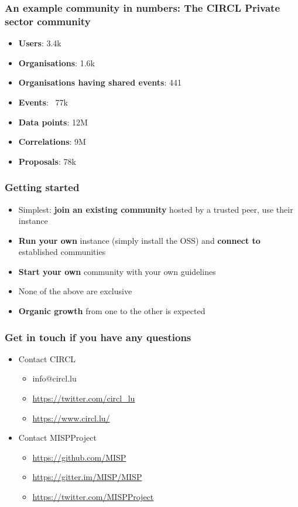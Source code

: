 \begin{frame}
\frametitle{An example community in numbers: The CIRCL Private sector community}
\begin{itemize}
       \item {\bf Users}: 3.4k
       \item {\bf Organisations}: 1.6k
       \item {\bf Organisations having shared events}: 441
       \item {\bf Events}: ~77k
       \item {\bf Data points}: 12M
       \item {\bf Correlations}: 9M
       \item {\bf Proposals}: 78k
\end{itemize}
\end{frame}

\begin{frame}
\frametitle{Getting started}
\begin{itemize}
       \item Simplest: {\bf join an existing community} hosted by a trusted peer, use their instance
       \item {\bf Run your own} instance (simply install the OSS) and {\bf connect to} established communities
       \item {\bf Start your own} community with your own guidelines
       \item None of the above are exclusive
       \item {\bf Organic growth} from one to the other is expected
\end{itemize}
\end{frame}

\begin{frame}
  \frametitle{Get in touch if you have any questions}
  \begin{itemize}
    \item Contact CIRCL
    \begin{itemize}
      \item info@circl.lu
      \item \url{https://twitter.com/circl_lu}
      \item \url{https://www.circl.lu/}
    \end{itemize}
    \item Contact MISPProject 
    \begin{itemize}
      \item \url{https://github.com/MISP}
      \item \url{https://gitter.im/MISP/MISP}
      \item \url{https://twitter.com/MISPProject}
    \end{itemize}
  \end{itemize}
\end{frame}
